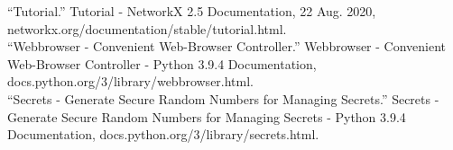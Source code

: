 \documentclass[fontsize=11pt]{article}
\begin{document}
“Tutorial.” Tutorial - NetworkX 2.5 Documentation, 22 Aug.
2020, networkx.org/documentation/stable/tutorial.html. \\

“Webbrowser - Convenient Web-Browser Controller.” Webbrowser - Convenient Web-Browser Controller - Python 3.9.4 Documentation, docs.python.org/3/library/webbrowser.html. \\

“Secrets - Generate Secure Random Numbers for Managing Secrets.” Secrets - Generate Secure Random Numbers for Managing Secrets - Python 3.9.4 Documentation, docs.python.org/3/library/secrets.html. \\

\end{document}
